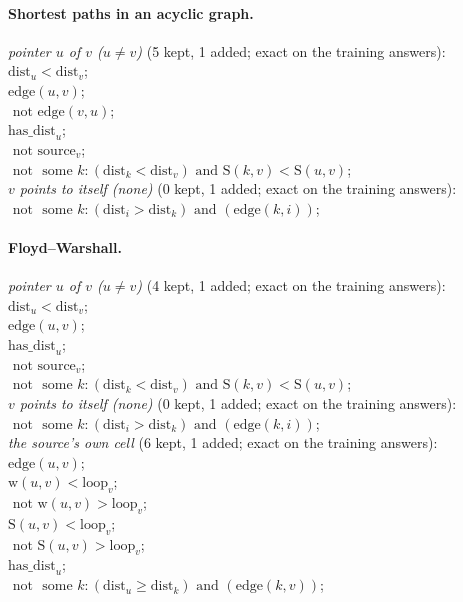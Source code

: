 \documentclass[10pt]{article}
\begin{document}
{\paragraph{Shortest paths in an acyclic graph.}
\emph{pointer $u$ of $v$ ($u \neq v$)} (5 kept, 1 added; exact on the training answers):\\
\quad $\mathrm{dist}_{u} < \mathrm{dist}_{v}$;\\
\quad $\mathrm{edge}(u, v)$;\\
\quad $\text{ not } \mathrm{edge}(v, u)$;\\
\quad $\mathrm{has\_dist}_{u}$;\\
\quad $\text{ not } \mathrm{source}_{v}$;\\
\quad $\text{ not } \text{ some } k: (\mathrm{dist}_{k} < \mathrm{dist}_{v}) \text{ and } \mathrm{S}(k, v) < \mathrm{S}(u, v)$;\\
\emph{$v$ points to itself (none)} (0 kept, 1 added; exact on the training answers):\\
\quad $\text{ not } \text{ some } k: (\mathrm{dist}_{i} > \mathrm{dist}_{k}) \text{ and } (\mathrm{edge}(k, i))$;

\paragraph{Floyd--Warshall.}
\emph{pointer $u$ of $v$ ($u \neq v$)} (4 kept, 1 added; exact on the training answers):\\
\quad $\mathrm{dist}_{u} < \mathrm{dist}_{v}$;\\
\quad $\mathrm{edge}(u, v)$;\\
\quad $\mathrm{has\_dist}_{u}$;\\
\quad $\text{ not } \mathrm{source}_{v}$;\\
\quad $\text{ not } \text{ some } k: (\mathrm{dist}_{k} < \mathrm{dist}_{v}) \text{ and } \mathrm{S}(k, v) < \mathrm{S}(u, v)$;\\
\emph{$v$ points to itself (none)} (0 kept, 1 added; exact on the training answers):\\
\quad $\text{ not } \text{ some } k: (\mathrm{dist}_{i} > \mathrm{dist}_{k}) \text{ and } (\mathrm{edge}(k, i))$;\\
\emph{the source's own cell} (6 kept, 1 added; exact on the training answers):\\
\quad $\mathrm{edge}(u, v)$;\\
\quad $\mathrm{w}(u, v) < \mathrm{loop}_{v}$;\\
\quad $\text{ not } \mathrm{w}(u, v) > \mathrm{loop}_{v}$;\\
\quad $\mathrm{S}(u, v) < \mathrm{loop}_{v}$;\\
\quad $\text{ not } \mathrm{S}(u, v) > \mathrm{loop}_{v}$;\\
\quad $\mathrm{has\_dist}_{u}$;\\
\quad $\text{ not } \text{ some } k: (\mathrm{dist}_{u}  \geq  \mathrm{dist}_{k}) \text{ and } (\mathrm{edge}(k, v))$;

}
\end{document}
